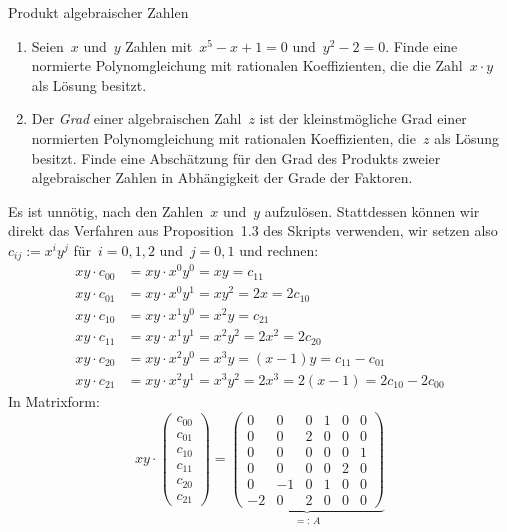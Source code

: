 \documentclass{algblatt}
\begin{document}
\begin{aufgabe}{Produkt algebraischer Zahlen}
\begin{enumerate}
\item Seien~$x$ und~$y$ Zahlen mit~$x^5-x+1=0$ und~$y^2-2=0$.
Finde eine normierte Polynomgleichung mit rationalen
Koeffizienten, die die Zahl~$x \cdot y$ als Lösung besitzt.
\item Der \emph{Grad} einer algebraischen Zahl~$z$ ist der kleinstmögliche Grad
einer normierten Polynomgleichung mit rationalen Koeffizienten, die~$z$ als Lösung
besitzt. Finde eine Abschätzung für den Grad des Produkts zweier algebraischer
Zahlen in Abhängigkeit der Grade der Faktoren.
\end{enumerate}
\begin{loesungE}
\item Es ist unnötig, nach den Zahlen~$x$ und~$y$ aufzulösen. Stattdessen
können wir direkt das Verfahren aus Proposition~1.3 des Skripts verwenden, wir
setzen also $c_{ij} := x^i y^j$ für~$i = 0,1,2$ und~$j = 0,1$ und rechnen:
\begin{align*}
  xy \cdot c_{00} &= xy \cdot x^0 y^0 = xy = c_{11} \\
  xy \cdot c_{01} &= xy \cdot x^0 y^1 = xy^2 = 2x = 2 c_{10} \\
  xy \cdot c_{10} &= xy \cdot x^1 y^0 = x^2y = c_{21} \\
  xy \cdot c_{11} &= xy \cdot x^1 y^1 = x^2y^2 = 2x^2 = 2 c_{20} \\
  xy \cdot c_{20} &= xy \cdot x^2 y^0 = x^3y = (x-1)y = c_{11} - c_{01} \\
  xy \cdot c_{21} &= xy \cdot x^2 y^1 = x^3y^2 = 2x^3 = 2(x-1) = 2 c_{10} - 2 c_{00}
\end{align*}
In Matrixform:
\[
  xy \cdot
  \begin{pmatrix}c_{00}\\c_{01}\\c_{10}\\c_{11}\\c_{20}\\c_{21}\end{pmatrix} =
  \underbrace{\begin{pmatrix}
    0&0&0&1&0&0 \\
    0&0&2&0&0&0 \\
    0&0&0&0&0&1 \\
    0&0&0&0&2&0 \\
    0&-1&0&1&0&0 \\
    -2&0&2&0&0&0
  \end{pmatrix}}_{=:\,A}
\]
\end{loesungE}
\end{aufgabe}
\end{document}

